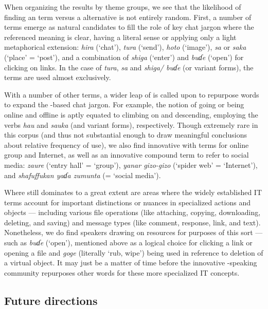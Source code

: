 \documentclass[output=paper,newtxmath,modfonts,nonflat,hidelinks]{langsci/langscibook}
\begin{document}
When organizing the results by theme groups, we see that the likelihood of finding an  term versus a  alternative is not entirely random. First, a number of  terms emerge as natural candidates to fill the role of key chat jargon where the referenced meaning is clear, having a literal sense or applying only a light metaphorical extension: \textit{hira} (‘chat’), \textit{tura} (‘send’), \textit{hoto} (‘image’), \textit{sa} or \textit{saka} (‘place’ = ‘post’), and a combination of \textit{shiga} (‘enter’) and \textit{buɗe} (‘open’) for clicking on links. In the case of \textit{tura}, \textit{sa} and \textit{shiga/ buɗe} (or variant forms), the  terms are used almost exclusively. 

With a number of other terms, a wider leap of  is called upon to repurpose  words to expand the -based chat jargon. For example, the notion of going or being online and offline is aptly equated to climbing on and descending, employing the  verbs \textit{hau} and \textit{sauka} (and variant forms), respectively. Though extremely rare in this corpus (and thus not substantial enough to draw meaningful conclusions about relative frequency of use), we also find innovative  with terms for online group and Internet, as well as an innovative compound term to refer to social media: \textit{zaure} (‘entry hall’ = ‘group’), \textit{yanar gizo-gizo} (‘spider web’ = ‘Internet’), and \textit{shafuffukan yaɗa zumunta} (= ‘social media’).

Where  still dominates to a great extent are areas where the widely established  IT terms account for important distinctions or nuances in specialized actions and objects — including various file operations (like attaching, copying, downloading, deleting, and saving) and message types (like comment, response, link, and text). Nonetheless, we do find speakers drawing on  resources for purposes of this sort — such as \textit{buɗe} (‘open’), mentioned above as a logical choice for clicking a link or opening a file and \textit{goge} (literally ‘rub, wipe’) being used in reference to deletion of a virtual object. It may just be a matter of time before the innovative -speaking community repurposes other  words for these more specialized IT concepts.  

\subsection{Future directions}
\end{document}
